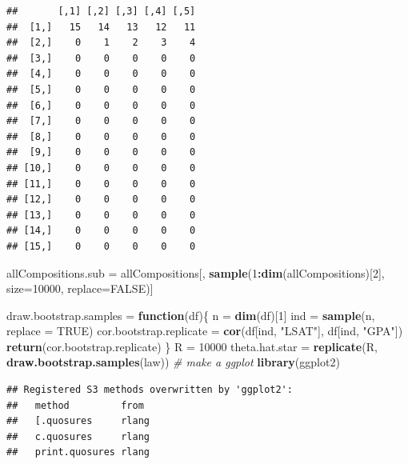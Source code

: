 \documentclass[]{article}
\newenvironment{Shaded}{\begin{snugshade}}{\end{snugshade}}
\newcommand{\CommentTok}[1]{\textcolor[rgb]{0.56,0.35,0.01}{\textit{#1}}}
\newcommand{\ControlFlowTok}[1]{\textcolor[rgb]{0.13,0.29,0.53}{\textbf{#1}}}
\newcommand{\DataTypeTok}[1]{\textcolor[rgb]{0.13,0.29,0.53}{#1}}
\newcommand{\DecValTok}[1]{\textcolor[rgb]{0.00,0.00,0.81}{#1}}
\newcommand{\KeywordTok}[1]{\textcolor[rgb]{0.13,0.29,0.53}{\textbf{#1}}}
\newcommand{\NormalTok}[1]{#1}
\newcommand{\OperatorTok}[1]{\textcolor[rgb]{0.81,0.36,0.00}{\textbf{#1}}}
\newcommand{\OtherTok}[1]{\textcolor[rgb]{0.56,0.35,0.01}{#1}}
\newcommand{\StringTok}[1]{\textcolor[rgb]{0.31,0.60,0.02}{#1}}
\begin{document}
\begin{verbatim}
##       [,1] [,2] [,3] [,4] [,5]
##  [1,]   15   14   13   12   11
##  [2,]    0    1    2    3    4
##  [3,]    0    0    0    0    0
##  [4,]    0    0    0    0    0
##  [5,]    0    0    0    0    0
##  [6,]    0    0    0    0    0
##  [7,]    0    0    0    0    0
##  [8,]    0    0    0    0    0
##  [9,]    0    0    0    0    0
## [10,]    0    0    0    0    0
## [11,]    0    0    0    0    0
## [12,]    0    0    0    0    0
## [13,]    0    0    0    0    0
## [14,]    0    0    0    0    0
## [15,]    0    0    0    0    0
\end{verbatim}

\begin{Shaded}
\begin{Highlighting}[]
\NormalTok{allCompositions.sub =}\StringTok{ }\NormalTok{allCompositions[, }\KeywordTok{sample}\NormalTok{(}\DecValTok{1}\OperatorTok{:}\KeywordTok{dim}\NormalTok{(allCompositions)[}\DecValTok{2}\NormalTok{], }\DataTypeTok{size=}\DecValTok{10000}\NormalTok{, }\DataTypeTok{replace=}\OtherTok{FALSE}\NormalTok{)]}

\NormalTok{draw.bootstrap.samples =}\StringTok{ }\ControlFlowTok{function}\NormalTok{(df)\{}
\NormalTok{  n =}\StringTok{ }\KeywordTok{dim}\NormalTok{(df)[}\DecValTok{1}\NormalTok{]}
\NormalTok{  ind =}\StringTok{ }\KeywordTok{sample}\NormalTok{(n, }\DataTypeTok{replace =} \OtherTok{TRUE}\NormalTok{)}
\NormalTok{  cor.bootstrap.replicate =}\StringTok{ }\KeywordTok{cor}\NormalTok{(df[ind, }\StringTok{"LSAT"}\NormalTok{], df[ind, }\StringTok{"GPA"}\NormalTok{])}
  \KeywordTok{return}\NormalTok{(cor.bootstrap.replicate)}
\NormalTok{\}}
\NormalTok{R =}\StringTok{ }\DecValTok{10000}
\NormalTok{theta.hat.star =}\StringTok{ }\KeywordTok{replicate}\NormalTok{(R, }\KeywordTok{draw.bootstrap.samples}\NormalTok{(law))}
\CommentTok{# make a ggplot}
\KeywordTok{library}\NormalTok{(ggplot2)}
\end{Highlighting}
\end{Shaded}

\begin{verbatim}
## Registered S3 methods overwritten by 'ggplot2':
##   method         from 
##   [.quosures     rlang
##   c.quosures     rlang
##   print.quosures rlang
\end{verbatim}
\end{document}
